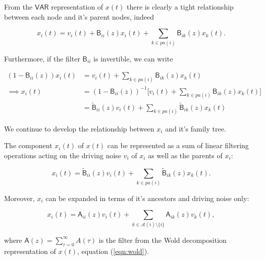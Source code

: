 \documentclass[12pt]{article}
\def\gcg{\mathcal{G}}  %
\def\VAR{\mathsf{VAR}}  %
\def\B{\mathsf{B}}  %
\def\wtB{\widetilde{\B}}  %
\def\A{\mathsf{A}}  %
\newcommand{\pa}[1]{pa(#1)}  %
\newcommand{\anc}[1]{\mathcal{A}(#1)}  %
\begin{document}
From the $\VAR$ representation of $x(t)$ there is clearly a tight
relationship between each node and it's parent nodes, indeed

\begin{equation}
  \label{eqn:parent_expanion}
  x_i(t) = v_i(t) + \B_{ii}(z)x_i(t) + \sum_{k \in \pa{i}}\B_{ik}(z)x_k(t).
\end{equation}

Furthermore, if the filter $\B_{ii}$ is invertible, we can write

\begin{equation*}
  \begin{aligned}
    (1 - \B_{ii}(z))x_i(t) &= v_i(t) + \sum_{k \in \pa{i}}\B_{ik}(z)x_k(t)\\
    \implies x_i(t) &= (1 - \B_{ii}(z))^{-1}\big[v_i(t) + \sum_{k \in \pa{i}}\B_{ik}(z)x_k(t)\big]\\
    &= \wtB_{ii}(z)v_i(t) + \sum_{k \in \pa{i}}\wtB_{ik}(z)x_k(t)
  \end{aligned}
\end{equation*}


We continue to develop the relationship between $x_i$ and it's family tree.

\begin{proposition}
  \label{prop:parent_expanding}
  The component $x_i(t)$ of $x(t)$ can be represented as a sum of
  linear filtering operations acting on the driving noise $v_i$ of
  $x_i$ as well as the parents of $x_i$:

  \begin{equation}
    \label{eqn:parent_expansion}
    x_i(t) = \wtB_{ii}(z)v_i(t) + \sum_{k \in \pa{i}}\wtB_{ik}(z)x_k(t).
  \end{equation}

  Moreover, $x_i$ can be expanded in terms of it's ancestors and
  driving noise only:

  \begin{equation}
    x_i(t) = \A_{ii}(z)v_i(t) + \sum_{k \in \anc{i} \setminus\{i\}}\A_{ik}(z)v_k(t),
  \end{equation}

  where $\A(z) = \sum_{\tau = 0}^\infty A(\tau)$ is the filter from
  the Wold decomposition representation of $x(t)$, equation
  (\ref{eqn:wold}).
\end{proposition}
\end{document}
